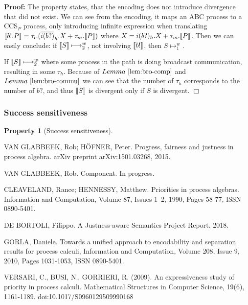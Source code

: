 \documentclass[adraft]{eptcs}
\newtheorem{ppt}{Property}
\newenvironment{proof}{\begin{trivlist} \item[\hspace{\labelsep}\bf Proof:]}{\hfill $\Box$\end{trivlist}}
\newcommand{\lem}[1]{Lemma~\ref{lem:#1}}
\newcommand{\plat}[1]{\raisebox{0pt}[0pt][0pt]{#1}}   %
\newcommand{\bkt}[1]{\llbracket \plat{$#1$} \rrbracket}
\begin{document}
\begin{proof}
	The property states, that the encoding does not introduce divergence that did not exist. We can see from the encoding, it maps an ABC process to a CCS$_P$ process, only introducing infinite expression when translating $\bkt{b!.P}=\tau_l.(\overline{i(b?)}_h.X + \tau_m.\bkt{P})$ where $X=i(b?)_h.X + \tau_m.\bkt{P}$. Then we can easily conclude: if $\bkt{S} \longmapsto_2^w$, not involving $\bkt{b!}$, then $S \longmapsto_1^w$.

	If $\bkt{S} \longmapsto_2^w$ where some process in the path is doing broadcast communication, resulting in some $\tau_h$. Because of $\lem{bro-comp}$ and $\lem{bro-commu}$ we can see that the number of $\tau_h$ corresponds to the number of $b?$, and thus $\bkt{S}$ is divergent only if $S$ is divergent.
\end{proof}

\subsubsection{Success sensitiveness}
\begin{ppt}[Success sensitiveness]

\end{ppt}

\newpage
\begin{thebibliography}{10}

VAN GLABBEEK, Rob; H\"OFNER, Peter. Progress, fairness and justness in process algebra. arXiv preprint arXiv:1501.03268, 2015.

VAN GLABBEEK, Rob. Component. In progress.

CLEAVELAND, Rance; HENNESSY, Matthew. Priorities in process algebras. Information and Computation, Volume 87, Issues 1–2, 1990, Pages 58-77, ISSN 0890-5401.

DE BORTOLI, Filippo. A Justness-aware Semantics Project Report. 2018.

GORLA, Daniele. Towards a unified approach to encodability and separation results for process calculi, Information and Computation, Volume 208, Issue 9, 2010, Pages 1031-1053, ISSN 0890-5401.

VERSARI, C., BUSI, N.,  GORRIERI, R. (2009). An expressiveness study of priority in process calculi. Mathematical Structures in Computer Science, 19(6), 1161-1189. doi:10.1017/S0960129509990168

\end{thebibliography}
\end{document}
